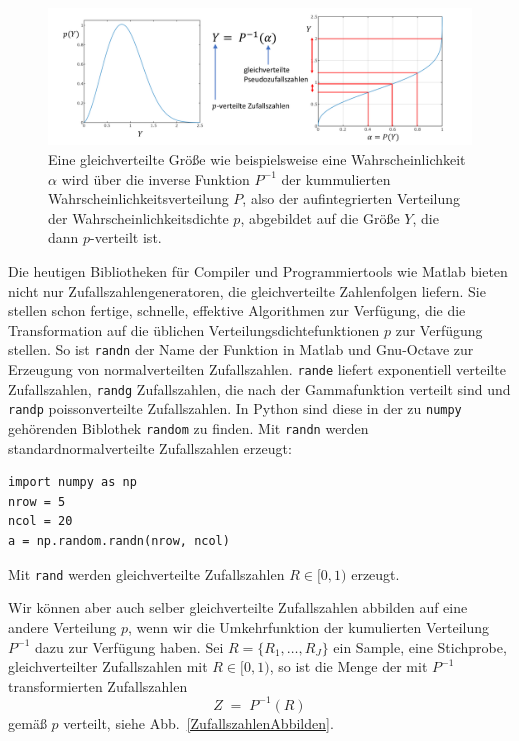 \begin{figure}
\begin{center}
\includegraphics[width=160mm]{09_vorlesung/media/TransformRandomDistri.pdf}
\caption{\label{pverteilteZufallszahlen} Eine gleichverteilte Größe wie beispielsweise
eine Wahrscheinlichkeit $\alpha$ wird über die inverse Funktion $P^{-1}$ der
kummulierten Wahrscheinlichkeitsverteilung $P$, also der aufintegrierten Verteilung
der Wahrscheinlichkeitsdichte $p$, abgebildet auf die Größe $Y$, die dann $p$-verteilt ist.}
\end{center}
\end{figure}
Die heutigen Bibliotheken für Compiler und Programmiertools wie Matlab bieten nicht nur
Zufallszahlengeneratoren, die gleichverteilte Zahlenfolgen liefern. Sie stellen schon
fertige, schnelle, effektive Algorithmen zur Verfügung, die die Transformation auf die üblichen
Verteilungsdichtefunktionen $p$ zur Verfügung stellen. So ist \texttt{randn} der Name der Funktion
in Matlab und Gnu-Octave zur Erzeugung von normalverteilten Zufallszahlen. \texttt{rande}
liefert exponentiell verteilte Zufallszahlen, \texttt{randg} Zufallszahlen, die nach
der Gammafunktion verteilt sind und \texttt{randp} poissonverteilte Zufallszahlen. In Python sind
diese in der zu \texttt{numpy} gehörenden Biblothek \texttt{random} zu finden. Mit
\texttt{randn} werden standardnormalverteilte Zufallszahlen erzeugt:
\begin{lstlisting}[style=Python]
import numpy as np
nrow = 5
ncol = 20
a = np.random.randn(nrow, ncol)
\end{lstlisting}
Mit \texttt{rand} werden gleichverteilte Zufallszahlen $R \in [0, 1)$ erzeugt.

Wir können aber auch selber gleichverteilte Zufallszahlen abbilden auf eine andere Verteilung $p$,
wenn wir die Umkehrfunktion der kumulierten Verteilung $P^{-1}$ dazu zur Verfügung haben.
Sei $R = \{R_1, \dots, R_J\}$ ein Sample, eine Stichprobe, gleichverteilter Zufallszahlen mit
$R \in [0,1)$, so ist die Menge der mit $P^{-1}$ transformierten Zufallszahlen
$$
Z \; = \; P^{-1}(R)
$$
gemäß $p$ verteilt, siehe Abb.~\ref{ZufallszahlenAbbilden}.

